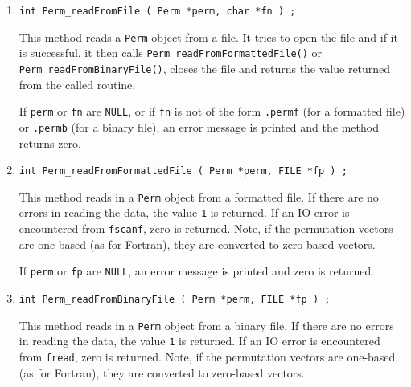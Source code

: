 \begin{enumerate}
\item
\begin{verbatim}
int Perm_readFromFile ( Perm *perm, char *fn ) ;
\end{verbatim}
\par
This method reads a {\tt Perm} object from a file.
It tries to open the file and if it is successful, 
it then calls {\tt Perm\_readFromFormattedFile()} or
{\tt Perm\_readFromBinaryFile()}, 
closes the file
and returns the value returned from the called routine.
\par {}
If {\tt perm} or {\tt fn} are {\tt NULL}, 
or if {\tt fn} is not of the form
{\tt *.permf} (for a formatted file) 
or {\tt *.permb} (for a binary file),
an error message is printed and the method returns zero.
\item
\begin{verbatim}
int Perm_readFromFormattedFile ( Perm *perm, FILE *fp ) ;
\end{verbatim}
\par
This method reads in a {\tt Perm} object from a formatted file.
If there are no errors in reading the data, 
the value {\tt 1} is returned.
If an IO error is encountered from {\tt fscanf}, zero is returned.
Note, if the permutation vectors are one-based (as for Fortran),
they are converted to zero-based vectors.
\par {}
If {\tt perm} or {\tt fp} are {\tt NULL},
an error message is printed and zero is returned.
\item
\begin{verbatim}
int Perm_readFromBinaryFile ( Perm *perm, FILE *fp ) ;
\end{verbatim}
\par
This method reads in a {\tt Perm} object from a binary file.
If there are no errors in reading the data, 
the value {\tt 1} is returned.
If an IO error is encountered from {\tt fread}, zero is returned.
Note, if the permutation vectors are one-based (as for Fortran),
they are converted to zero-based vectors.
\par {}

\end{enumerate}

